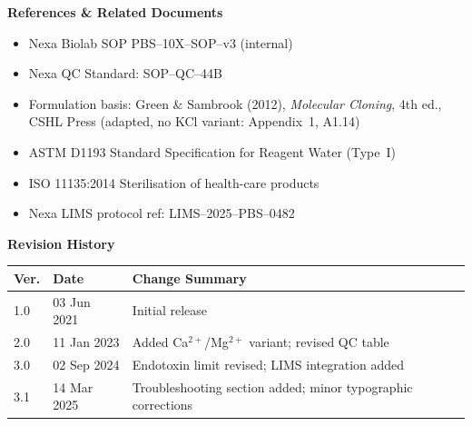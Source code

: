 \documentclass[10pt,a4paper]{article}
\begin{document}
\noindent
\begin{minipage}[t]{0.54\linewidth}
  \begin{tcolorbox}[
    enhanced, arc=4pt, boxrule=0.5pt,
    colback=NexaLight, colframe=NexaBorder,
    top=3mm, bottom=3mm, left=4mm, right=4mm,
  ]
    {\color{NexaBlue}\small\bfseries\faBook\enskip References \& Related Documents}
    \vspace{1.5mm}

    \small\color{NexaText}
    \begin{itemize}[leftmargin=4mm, itemsep=1pt, topsep=0pt]
      \item Nexa Biolab SOP PBS--10X--SOP--v3 (internal)
      \item Nexa QC Standard: SOP--QC--44B
      \item Formulation basis: Green \& Sambrook (2012), \textit{Molecular Cloning},
            4th ed., CSHL Press (adapted, no KCl variant: Appendix~1, A1.14)
      \item ASTM D1193 Standard Specification for Reagent Water (Type~I)
      \item ISO 11135:2014 Sterilisation of health-care products
      \item Nexa LIMS protocol ref: LIMS--2025--PBS--0482
    \end{itemize}
  \end{tcolorbox}
\end{minipage}%
\hfill
\begin{minipage}[t]{0.44\linewidth}
  \begin{tcolorbox}[
    enhanced, arc=4pt, boxrule=0.5pt,
    colback=NexaLight, colframe=NexaBorder,
    top=3mm, bottom=3mm, left=4mm, right=4mm,
  ]
    {\color{NexaBlue}\small\bfseries\faPen\enskip Revision History}
    \vspace{1.5mm}

    \small\color{NexaText}
    \renewcommand{\arraystretch}{1.25}
    \begin{tabular}{@{}l l p{4.2cm}@{}}
      \bfseries Ver. & \bfseries Date & \bfseries Change Summary \\
      \midrule
      1.0 & 03 Jun 2021 & Initial release \\
      2.0 & 11 Jan 2023 & Added Ca$^{2+}$/Mg$^{2+}$ variant; revised QC table \\
      3.0 & 02 Sep 2024 & Endotoxin limit revised; LIMS integration added \\
      3.1 & 14 Mar 2025 & Troubleshooting section added; minor typographic corrections \\
    \end{tabular}
  \end{tcolorbox}
\end{minipage}
\end{document}
